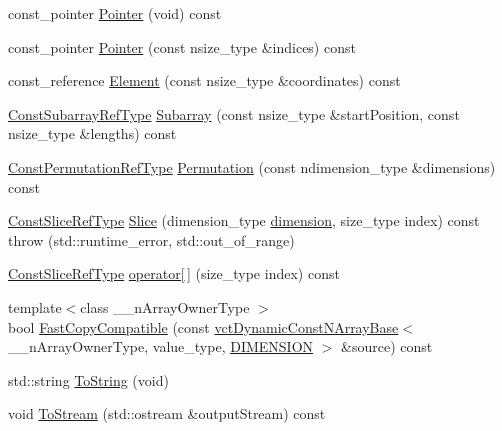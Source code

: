 \begin{DoxyCompactItemize}
\item 
const\+\_\+pointer \hyperlink{classvct_dynamic_const_n_array_base_a25569e83166416c770ce27ab110b3da9}{Pointer} (void) const 
\item 
const\+\_\+pointer \hyperlink{classvct_dynamic_const_n_array_base_a14f9fc2a054cb06b3143badafaa387e7}{Pointer} (const nsize\+\_\+type \&indices) const 
\item 
const\+\_\+reference \hyperlink{classvct_dynamic_const_n_array_base_afcc2aa2aaeb25a94e1e52c218ce5be87}{Element} (const nsize\+\_\+type \&coordinates) const 
\item 
\hyperlink{classvct_dynamic_const_n_array_base_a4b3508630e409eda4f0d2f55d17d89a4}{Const\+Subarray\+Ref\+Type} \hyperlink{classvct_dynamic_const_n_array_base_a8a88c0496fccecdb88a773cc5d0bef84}{Subarray} (const nsize\+\_\+type \&start\+Position, const nsize\+\_\+type \&lengths) const 
\item 
\hyperlink{classvct_dynamic_const_n_array_base_a412fcb88d50ea2e1d809efab113968fc}{Const\+Permutation\+Ref\+Type} \hyperlink{classvct_dynamic_const_n_array_base_a3fd5e02305f664b17e54231ca78b8da2}{Permutation} (const ndimension\+\_\+type \&dimensions) const 
\item 
\hyperlink{classvct_dynamic_const_n_array_base_ad4a09eb0789ba4c5b8d799fbe0ee3d79}{Const\+Slice\+Ref\+Type} \hyperlink{classvct_dynamic_const_n_array_base_a095e5f16394b59310987eac507bf6e16}{Slice} (dimension\+\_\+type \hyperlink{classvct_dynamic_const_n_array_base_aad976ad48dc9b1006d9e2729195f0b7c}{dimension}, size\+\_\+type index) const   throw (std\+::runtime\+\_\+error, std\+::out\+\_\+of\+\_\+range)
\item 
\hyperlink{classvct_dynamic_const_n_array_base_ad4a09eb0789ba4c5b8d799fbe0ee3d79}{Const\+Slice\+Ref\+Type} \hyperlink{classvct_dynamic_const_n_array_base_ab6d97ba698b824cd14c35bce8c39a561}{operator\mbox{[}$\,$\mbox{]}} (size\+\_\+type index) const 
\item 
{\footnotesize template$<$class \+\_\+\+\_\+n\+Array\+Owner\+Type $>$ }\\bool \hyperlink{classvct_dynamic_const_n_array_base_a324d0b47c36b576a0cdcdbaa0c279934}{Fast\+Copy\+Compatible} (const \hyperlink{classvct_dynamic_const_n_array_base}{vct\+Dynamic\+Const\+N\+Array\+Base}$<$ \+\_\+\+\_\+n\+Array\+Owner\+Type, value\+\_\+type, \hyperlink{classvct_dynamic_const_n_array_base_a815ac316ebc1bb2ab1969d307549826faf759c9ab831ff929b89af4ea2865a378}{D\+I\+M\+E\+N\+S\+I\+O\+N} $>$ \&source) const 
\item 
std\+::string \hyperlink{classvct_dynamic_const_n_array_base_ad656498d357917484f821278322895bb}{To\+String} (void)
\item 
void \hyperlink{classvct_dynamic_const_n_array_base_a091d2040dff2016a444a169554dfda2c}{To\+Stream} (std\+::ostream \&output\+Stream) const 
\end{DoxyCompactItemize}
